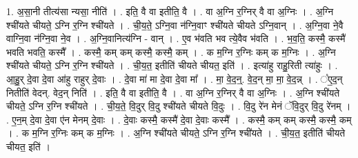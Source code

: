 \documentclass[17pt]{extarticle}
\begin{document}
1. अ॒सा॒नी तीत्य॑सा न्यसा॒ नीति॑ । . इति॒ वै वा इतीति॒ वै । . वा अ॒ग्नि र॒ग्निर् वै वा अ॒ग्निः । . अ॒ग्नि श्ची॑यते चीयते॒ ऽग्नि र॒ग्नि श्ची॑यते । . ची॒य॒ते॒ ऽग्नि॒वा न॑ग्नि॒वाꣳ श्ची॑यते चीयते ऽग्नि॒वान् । . अ॒ग्नि॒वा ने॒वै वाग्नि॒वा न॑ग्नि॒वा ने॒व । . अ॒ग्नि॒वानित्य॑ग्नि - वान् । . ए॒व भ॑वति भव त्ये॒वैव भ॑वति । . भ॒व॒ति॒ कस्मै॒ कस्मै॑ भवति भवति॒ कस्मै᳚ । . कस्मै॒ कम् कम् कस्मै॒ कस्मै॒ कम् । . क म॒ग्नि र॒ग्निः कम् क म॒ग्निः । . अ॒ग्नि श्ची॑यते चीयते॒ ऽग्नि र॒ग्नि श्ची॑यते । . ची॒य॒त॒ इतीति॑ चीयते चीयत॒ इति॑ । . इत्या॑हु राहु॒रिती त्या॑हुः । . आ॒हु॒र् दे॒वा दे॒वा आ॑हु राहुर् दे॒वाः । . दे॒वा मा॑ मा दे॒वा दे॒वा मा᳚ । . मा॒ वे॒द॒न्॒. वे॒द॒न् मा॒ मा॒ वे॒द॒न्न् । . ꣡ए॒द॒न् नितीति॑ वेदन्. वेद॒न् निति॑ । . इति॒ वै वा इतीति॒ वै । . वा अ॒ग्नि र॒ग्निर् वै वा अ॒ग्निः । . अ॒ग्नि श्ची॑यते चीयते॒ ऽग्नि र॒ग्नि श्ची॑यते । . ची॒य॒ते॒ वि॒दुर् वि॒दु श्ची॑यते चीयते वि॒दुः । . वि॒दु रे॑न मेनं ॅवि॒दुर् वि॒दु रे॑नम् । . ए॒न॒म् दे॒वा दे॒वा ए॑न मेनम् दे॒वाः । . दे॒वाः कस्मै॒ कस्मै॑ दे॒वा दे॒वाः कस्मै᳚ । . कस्मै॒ कम् कम् कस्मै॒ कस्मै॒ कम् । . क म॒ग्नि र॒ग्निः कम् क म॒ग्निः । . अ॒ग्नि श्ची॑यते चीयते॒ ऽग्नि र॒ग्नि श्ची॑यते । . ची॒य॒त॒ इतीति॑ चीयते चीयत॒ इति॑ । \newline
\end{document}

